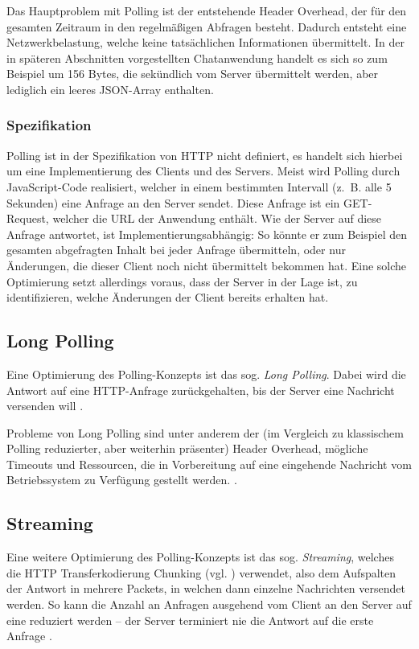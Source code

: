 \documentclass[sigplan, screen]{acmart}
\begin{document}
Das Hauptproblem mit Polling ist der entstehende Header Overhead, der für den gesamten Zeitraum in den regelmäßigen Abfragen besteht.
Dadurch entsteht eine Netzwerkbelastung, welche keine tatsächlichen Informationen übermittelt. 
In der in späteren Abschnitten vorgestellten Chatanwendung handelt es sich so zum Beispiel um 156 Bytes, die sekündlich vom Server übermittelt werden,
aber lediglich ein leeres JSON-Array enthalten.

\subsubsection{Spezifikation} 

Polling ist in der Spezifikation von HTTP nicht definiert, es handelt sich hierbei um eine Implementierung des Clients und des Servers.
Meist wird Polling durch JavaScript-Code realisiert, welcher in einem bestimmten Intervall (z. B. alle 5 Sekunden) eine Anfrage an den Server sendet.
Diese Anfrage ist ein GET-Request, welcher die URL der Anwendung enthält.
Wie der Server auf diese Anfrage antwortet, ist Implementierungsabhängig:
So könnte er zum Beispiel den gesamten abgefragten Inhalt bei jeder Anfrage übermitteln, oder nur Änderungen, die dieser Client noch nicht übermittelt bekommen hat.
Eine solche Optimierung setzt allerdings voraus, dass der Server in der Lage ist, zu identifizieren, welche Änderungen der Client bereits erhalten hat.

\subsection{Long Polling}

Eine Optimierung des Polling-Konzepts ist das sog. \emph{Long Polling}.
Dabei wird die Antwort auf eine HTTP-Anfrage zurückgehalten, bis der Server eine Nachricht versenden will \cite{noauthor_long_2021}. 

Probleme von Long Polling sind unter anderem der (im Vergleich zu klassischem Polling reduzierter, aber weiterhin präsenter)
Header Overhead, mögliche Timeouts und Ressourcen, die in Vorbereitung auf eine eingehende Nachricht vom Betriebssystem
zu Verfügung gestellt werden. \cite[Abs. 2.2]{saint-andre_known_2011}.

\subsection{Streaming}

Eine weitere Optimierung des Polling-Konzepts ist das sog. \emph{Streaming},
welches die HTTP Transferkodierung Chunking (vgl. \cite[Abs. 7.1]{fielding_http_2022}) verwendet, 
also dem Aufspalten der Antwort in mehrere Packets, in welchen dann einzelne Nachrichten versendet werden.
So kann die Anzahl an Anfragen ausgehend vom Client an den Server auf eine reduziert werden --
der Server terminiert nie die Antwort auf die erste Anfrage \cite[Abs. 3]{saint-andre_known_2011}.
\end{document}
